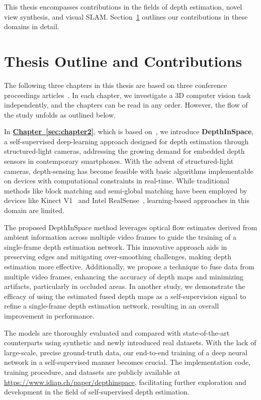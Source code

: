 This thesis encompasses contributions in the fields of depth estimation, novel view synthesis, and visual SLAM. Section~\ref{sec:c1_outline} outlines our contributions in these domains in detail.

\section{Thesis Outline and Contributions} \label{sec:c1_outline}

The following three chapters in this thesis are based on three conference proceedings articles~\citep{johari2021depthinspace,johari2022geonerf, johari2023eslam}. In each chapter, we investigate a 3D computer vision task independently, and the chapters can be read in any order. However, the flow of the study unfolds as outlined below.

In \textbf{\hyperref[sec:chapter2]{Chapter~\ref{sec:chapter2}}}, which is based on~\cite{johari2021depthinspace}, we introduce \textbf{DepthInSpace}, a self-supervised deep-learning approach designed for depth estimation through structured-light cameras, addressing the growing demand for embedded depth sensors in contemporary smartphones. With the advent of structured-light cameras, depth-sensing has become feasible with basic algorithms implementable on devices with computational constraints in real-time. While traditional methods like block matching and semi-global matching have been employed by devices like Kinect V1~\citep{martinez2013kinect} and Intel RealSense~\citep{keselman2017intel}, learning-based approaches in this domain are limited.

The proposed DepthInSpace method leverages optical flow estimates derived from ambient information across multiple video frames to guide the training of a single-frame depth estimation network. This innovative approach aids in preserving edges and mitigating over-smoothing challenges, making depth estimation more effective. Additionally, we propose a technique to fuse data from multiple video frames, enhancing the accuracy of depth maps and minimizing artifacts, particularly in occluded areas. In another study, we demonstrate the efficacy of using the estimated fused depth maps as a self-supervision signal to refine a single-frame depth estimation network, resulting in an overall improvement in performance.

The models are thoroughly evaluated and compared with state-of-the-art counterparts using synthetic and newly introduced real datasets. With the lack of large-scale, precise ground-truth data, our end-to-end training of a deep neural network in a self-supervised manner becomes crucial. The implementation code, training procedure, and datasets are publicly available at \href{https://www.idiap.ch/paper/depthinspace}{https://www.idiap.ch/paper/depthinspace}, facilitating further exploration and development in the field of self-supervised depth estimation.

